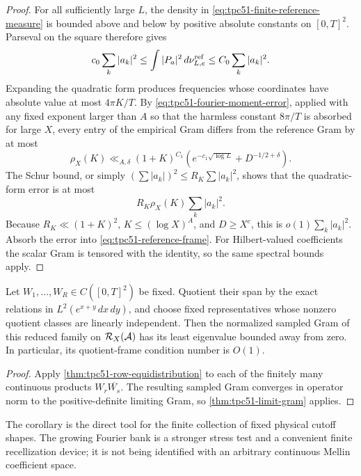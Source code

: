 \begin{proof}
For all sufficiently large \(L\), the density in
\eqref{eq:tpc51-finite-reference-measure} is bounded above and below by
positive absolute constants on \([0,T]^2\).  Parseval on the square
therefore gives
\begin{equation}
 c_0\sum_k|a_k|^2
 \leq\int|P_a|^2\,d\nu_{L,e}^{\rm ref}
 \leq C_0\sum_k|a_k|^2.
 \label{eq:tpc51-reference-frame}
\end{equation}
Expanding the quadratic form produces frequencies whose coordinates
have absolute value at most \(4\pi K/T\).  By
\eqref{eq:tpc51-fourier-moment-error}, applied with any fixed exponent
larger than \(A\) so that the harmless constant \(8\pi/T\) is absorbed
for large \(X\), every entry of the empirical
Gram differs from the reference Gram by at most
\begin{equation}
 \rho_X(K)\ll_{A,\delta}
 (1+K)^{C_1}
 \left(e^{-c_1\sqrt{\log L}}+D^{-1/2+\delta}\right).
 \label{eq:tpc51-bank-entry-error}
\end{equation}
The Schur bound, or simply
\((\sum|a_k|)^2\leq R_K\sum|a_k|^2\), shows that the quadratic-form
error is at most
\begin{equation}
 R_K\rho_X(K)\sum_k|a_k|^2.
 \label{eq:tpc51-bank-operator-error}
\end{equation}
Because \(R_K\ll(1+K)^2\), \(K\leq(\log X)^A\), and
\(D\geq X^c\), this is \(o(1)\sum_k|a_k|^2\).  Absorb the error into
\eqref{eq:tpc51-reference-frame}.  For Hilbert-valued coefficients the
scalar Gram is tensored with the identity, so the same spectral bounds
apply.
\end{proof}

\begin{corollary}
\label{cor:tpc51-fixed-physical-family}
Let \(W_1,\ldots,W_R\in C([0,T]^2)\) be fixed.  Quotient their span by
the exact relations in \(L^2(e^{x+y}\,dx\,dy)\), and choose fixed
representatives whose nonzero quotient classes are linearly independent.
Then the normalized sampled Gram of this reduced family on
\(\mathcal R_X(\mathcal A)\) has its least eigenvalue bounded away from zero.  In
particular, its quotient-frame condition number is \(O(1)\).
\end{corollary}

\begin{proof}
Apply \cref{thm:tpc51-row-equidistribution} to each of the finitely many
continuous products \(W_r\overline{W_s}\).  The resulting sampled Gram
converges in operator norm to the positive-definite limiting Gram, so
\cref{thm:tpc51-limit-gram} applies.
\end{proof}

The corollary is the direct tool for the finite collection of fixed
physical cutoff shapes.  The growing Fourier bank is a stronger stress
test and a convenient finite recellization device; it is not being
identified with an arbitrary continuous Mellin coefficient space.
